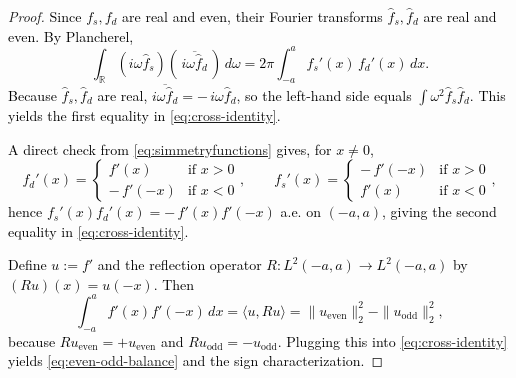 \documentclass[preprint,hidelinks,authoryear]{elsarticle}
\theoremstyle{plain}
\theoremstyle{definition}
\theoremstyle{remark}
\begin{document}
\begin{proof}
\textcolor{black}{
Since $f_s,f_d$ are real and even, their Fourier transforms $\hat f_s,\hat f_d$ are real and even. By Plancherel,
$$
\int_{\mathbb{R}}(i\omega \hat f_s)(\,\overline{i\omega \hat f_d}\,)\,d\omega
=2\pi\int_{-a}^a f_s'(x)\,f_d'(x)\,dx.
$$
Because $\hat f_s,\hat f_d$ are real, $\overline{i\omega \hat f_d}=-\,i\omega \hat f_d$, so the left-hand side equals $\int \omega^2 \hat f_s \hat f_d$. This yields the first equality in \eqref{eq:cross-identity}.
}

\textcolor{black}{
A direct check from \eqref{eq:simmetryfunctions} gives, for $x\neq 0$,
$$
f_d'(x)=\begin{cases} f'(x) & \text{if } x>0\\ -\,f'(-x) & \text{if } x<0\end{cases},
\qquad
f_s'(x)=\begin{cases} -\,f'(-x) &  \text{if } x>0\\ f'(x)& \text{if } x<0\end{cases},
$$
hence $f_s'(x)f_d'(x)=-\,f'(x)f'(-x)$ a.e. on $(-a,a)$, giving the second equality in \eqref{eq:cross-identity}.}

\textcolor{black}{Define $u:=f'$ and the reflection operator $R:L^2(-a,a)\to L^2(-a,a)$ by $(Ru)(x)=u(-x)$. Then
$$
\int_{-a}^a f'(x)f'(-x)\,dx=\langle u,Ru\rangle
=\|u_{\mathrm{even}}\|_2^2-\|u_{\mathrm{odd}}\|_2^2,
$$
because $Ru_{\mathrm{even}}=+u_{\mathrm{even}}$ and $Ru_{\mathrm{odd}}=-u_{\mathrm{odd}}$. Plugging this into \eqref{eq:cross-identity} yields \eqref{eq:even-odd-balance} and the sign characterization.}
\end{proof}
\end{document}
